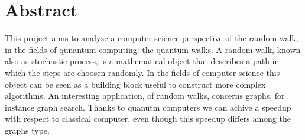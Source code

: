 \section{Abstract}

This project aims to analyze a computer science perspective of the random walk, in the fields of qunantum computing: the quantum walks. A random walk, known 
also as stochastic process, is a mathematical object that describes a path in which the steps are choosen randomly. In the fields of computer science this object can 
be seen as a building block useful to construct more complex algorithms. An interesting application, of random walks, concerns graphs, for instance graph search. 
Thanks to quanutm computers we can achive a speedup with respect to classical computer, even though this speedup differs among the graphs type.       
